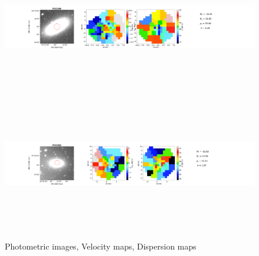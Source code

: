 \documentclass{aa}
\begin{document}
\begin{figure}[!htb]
   \includegraphics[width=21cm,height=6cm,keepaspectratio]{../2_pipeline/1_V&S_Maps/106Velocity_map.pdf}
   \includegraphics[width=21cm,height=6cm,keepaspectratio]{../2_pipeline/1_V&S_Maps/202Velocity_map.pdf}
         \caption{Photometric images, Velocity maps, Dispersion maps}
         \label{FigVelDis}
\end{figure}
\clearpage
%
\end{document}
